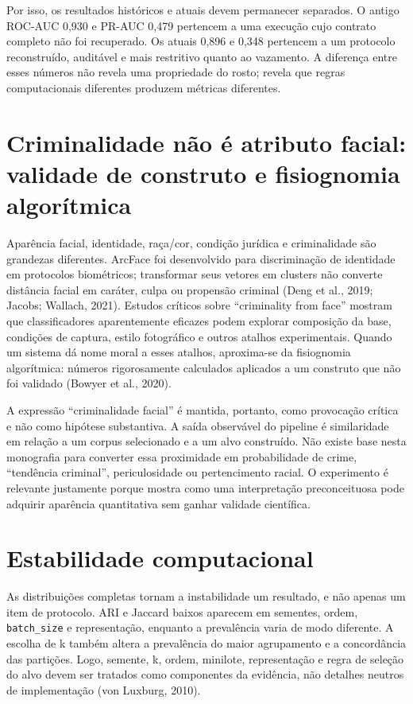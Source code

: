 Por isso, os resultados históricos e atuais devem permanecer separados. O antigo ROC-AUC 0,930 e PR-AUC 0,479 pertencem a uma execução cujo contrato completo não foi recuperado. Os atuais 0,896 e 0,348 pertencem a um protocolo reconstruído, auditável e mais restritivo quanto ao vazamento. A diferença entre esses números não revela uma propriedade do rosto; revela que regras computacionais diferentes produzem métricas diferentes.

\section{Criminalidade não é atributo facial: validade de construto e fisiognomia algorítmica}

Aparência facial, identidade, raça/cor, condição jurídica e criminalidade são grandezas diferentes. ArcFace foi desenvolvido para discriminação de identidade em protocolos biométricos; transformar seus vetores em clusters não converte distância facial em caráter, culpa ou propensão criminal (Deng et al., 2019; Jacobs; Wallach, 2021). Estudos críticos sobre ``criminality from face'' mostram que classificadores aparentemente eficazes podem explorar composição da base, condições de captura, estilo fotográfico e outros atalhos experimentais. Quando um sistema dá nome moral a esses atalhos, aproxima-se da fisiognomia algorítmica: números rigorosamente calculados aplicados a um construto que não foi validado (Bowyer et al., 2020).

A expressão ``criminalidade facial'' é mantida, portanto, como provocação crítica e não como hipótese substantiva. A saída observável do pipeline é similaridade em relação a um corpus selecionado e a um alvo construído. Não existe base nesta monografia para converter essa proximidade em probabilidade de crime, ``tendência criminal'', periculosidade ou pertencimento racial. O experimento é relevante justamente porque mostra como uma interpretação preconceituosa pode adquirir aparência quantitativa sem ganhar validade científica.

\section{Estabilidade computacional}

As distribuições completas tornam a instabilidade um resultado, e não apenas um item de protocolo. ARI e Jaccard baixos aparecem em sementes, ordem, \texttt{batch\_size} e representação, enquanto a prevalência varia de modo diferente. A escolha de k também altera a prevalência do maior agrupamento e a concordância das partições. Logo, semente, k, ordem, minilote, representação e regra de seleção do alvo devem ser tratados como componentes da evidência, não detalhes neutros de implementação (von Luxburg, 2010).

